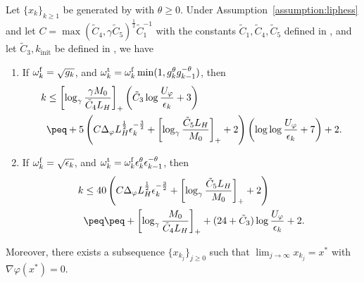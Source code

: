 \begin{theorem}
    \label{thm:appendix/global-newton-complexity}
    Let $\{ x_k \}_{k \ge 1}$ be generated by  with $\theta \geq 0$. 
    Under Assumption~\ref{assumption:liphess} and let $C = \max(\tilde C_4, \gamma \tilde C_5)^{\frac{1}{2}} \tilde C_1^{-1}$ 
    with the constants $\tilde C_1, \tilde C_4, \tilde C_5$ defined in ,
    and let $\tilde C_3, k_{\mathrm{init}}$ be defined in ,
    we have
    \begin{enumerate}
        \item
        If $\omega_k^{\mathrm{f}} = \sqrt{g_k}$, and $\omega_k^{\mathrm{t}} = \omega_k^{\mathrm{f}} \min ( 1, g_k^\theta g_{k-1}^{-\theta} )$, 
        then 
        \begin{align*}
        k
        &\leq 
        \left[ \log_\gamma \frac{\gamma M_0}{\tilde C_4 L_H} \right]_+
        \left ( \tilde C_3 \log \frac{U_\varphi}{\epsilon_{k}} + 3 \right ) \\
        &\peq + 
        5\left ( C\Delta_\varphi L_H^{\frac{1}{2}} 
        \epsilon_k^{-\frac{3}{2}}
        + \left[ \log_\gamma \frac{\tilde C_5 L_H}{M_0} \right]_+ + 2 \right )
        \left ( \log\log \frac{U_\varphi}{\epsilon_k} + 7 \right )
        + 2
        .
        \end{align*}
        \item
        If $\omega_k^{\mathrm{f}} = \sqrt{\epsilon_k}$, 
        and $\omega_k^{\mathrm{t}} = \omega_k^{\mathrm{f}} \epsilon_k^\theta \epsilon_{k-1}^{-\theta}$, 
        then 
        \begin{align*}
        k
        &\leq 
        40 \left ( C\Delta_\varphi L_H^{\frac{1}{2}} 
        \epsilon_k^{-\frac{3}{2}}
        + \left[ \log_\gamma \frac{\tilde C_5 L_H}{M_0} \right]_+ + 2 \right ) \\
        &\peq  \peq
        + \left[ \log_\gamma \frac{M_0}{\tilde C_4L_H} \right]_+
        + (24 + \tilde C_3)\log \frac{U_\varphi}{\epsilon_k}
        + 2
        .
        \end{align*}
    \end{enumerate}
    Moreover, there exists a subsequence $\{ x_{k_j} \}_{j \geq 0}$ such that $\lim_{j \to \infty} x_{k_j} = x^*$ with $\nabla \varphi(x^*) = 0$.
\end{theorem}
